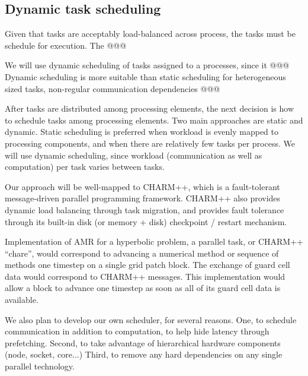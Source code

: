 \documentclass[14pt,letter]{article}
\begin{document}
\subsection{Dynamic task scheduling}

Given that tasks are acceptably load-balanced across process, the
tasks must be schedule for execution.  The @@@


We will use dynamic scheduling of tasks assigned to a processes, since
it @@@  Dynamic scheduling is more suitable than static scheduling for
heterogeneous sized tasks, non-regular communication dependencies @@@


After tasks are distributed among processing elements, the next
decision is how to schedule tasks among processing elements.  Two main
approaches are static and dynamic.  Static scheduling is preferred
when workload is evenly mapped to processing components, and when
there are relatively few tasks per process.  We will use dynamic
scheduling, since workload (communication as well as computation) per
task varies between tasks.

Our approach will be well-mapped to CHARM++,
which is a fault-tolerant message-driven parallel programming
framework.  CHARM++ also provides dynamic load balancing through task
migration, and provides fault tolerance through its built-in disk (or
memory + disk) checkpoint / restart mechanism.

Implementation of AMR for a hyperbolic problem, a parallel task, or
CHARM++ ``chare'', would correspond to advancing a numerical method or
sequence of methods one timestep on a single grid patch block.  The
exchange of guard cell data would correspond to CHARM++ messages.
This implementation would allow a block to advance one timestep as
soon as all of its guard cell data is available.


We also plan to develop our own scheduler, for several reasons.  One,
to schedule communication in addition to computation, to help hide
latency through prefetching.  Second, to take advantage of
hierarchical hardware components (node, socket, core...)  Third, to
remove any hard dependencies on any single parallel technology.
\end{document}
